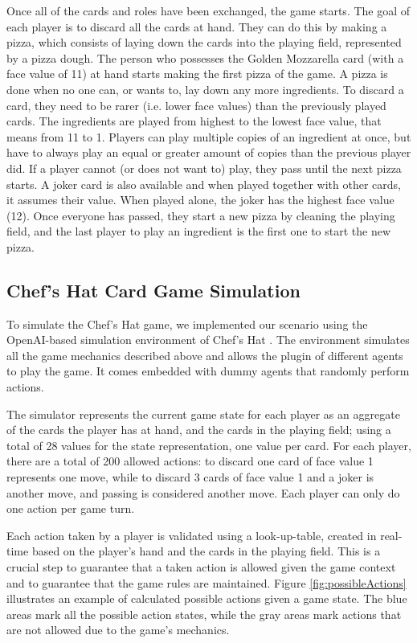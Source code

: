 \documentclass[a4paper,conference]{IEEEtran}
\begin{document}
Once all of the cards and roles have been exchanged, the game starts. The goal of each player is to discard all the cards at hand. They can do this by making a pizza, which consists of laying down the cards into the playing field, represented by a pizza dough. The person who possesses the Golden Mozzarella card (with a face value of 11) at hand starts making the first pizza of the game. A pizza is done when no one can, or wants to, lay down any more ingredients. To discard a card, they need to be rarer (i.e. lower face values) than the previously played cards. The ingredients are played from highest to the lowest face value, that means from 11 to 1. Players can play multiple copies of an ingredient at once, but have to always play an equal or greater amount of copies than the previous player did. If a player cannot (or does not want to) play, they pass until the next pizza starts. A joker card is also available and when played together with other cards, it assumes their value. When played alone, the joker has the highest face value (12). Once everyone has passed, they start a new pizza by cleaning the playing field, and the last player to play an ingredient is the first one to start the new pizza.

\subsection{Chef's Hat Card Game Simulation}

To simulate the Chef's Hat game, we implemented our scenario using the OpenAI-based simulation environment of Chef's Hat \cite{barros2020food}. The environment simulates all the game mechanics described above and allows the plugin of different agents to play the game. It comes embedded with dummy agents that randomly perform actions.

The simulator represents the current game state for each player as an aggregate of the cards the player has at hand, and the cards in the playing field; using a total of 28 values for the state representation, one value per card. For each player, there are a total of 200 allowed actions: to discard one card of face value 1 represents one move, while to discard 3 cards of face value 1 and a joker is another move, and passing is considered another move. Each player can only do one action per game turn.

Each action taken by a player is validated using a look-up-table, created in real-time based on the player's hand and the cards in the playing field. This is a crucial step to guarantee that a taken action is allowed given the game context and to guarantee that the game rules are maintained.  Figure \ref{fig:possibleActions} illustrates an example of calculated possible actions given a game state. The blue areas mark all the possible action states, while the gray areas mark actions that are not allowed due to the game's mechanics. 
\end{document}
